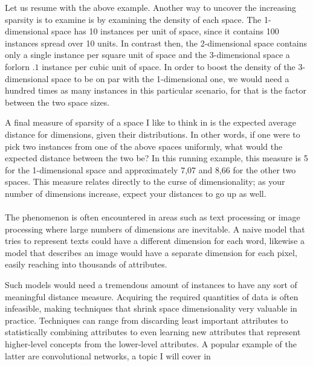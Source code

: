 Let us resume with the above example.
Another way to uncover the increasing sparsity is to examine
is by examining the density of each space.
The 1-dimensional space has 10 instances per unit of space,
since it contains 100 instances spread over 10 units.
In contrast then, the 2-dimensional space contains
only a single instance per square unit of space
and the 3-dimensional space a forlorn $.1$ instance
per cubic unit of space.
In order to boost the density of the 3-dimensional space
to be on par with the 1-dimensional one,
we would need a hundred times as many instances
in this particular scenario,
for that is the factor between the two space sizes.

A final measure of sparsity of a space I like to think in
is the expected average distance for dimensions,
given their distributions.
In other words,
if one were to pick two instances from one of the above spaces uniformly,
what would the expected distance between the two be?
In this running example, %
this measure is 5 for the 1-dimensional space
and approximately 7,07 and 8,66 for the other
two spaces.
This measure relates directly to the curse of dimensionality;
as your number of dimensions increase,
expect your distances to go up as well.

\paragraph{}
The phenomenon is often encountered in areas such as
text processing or image processing
where large numbers of dimensions are inevitable.
A naive model that tries to represent texts
could have a different dimension for each word,
likewise a model that describes an image
would have a separate dimension for each pixel,
easily reaching into thousands of attributes.

Such models would need a tremendous amount
of instances to have any sort of meaningful
distance measure.
Acquiring the required quantities of data
is often infeasible,
making techniques that shrink space dimensionality
very valuable in practice.
Techniques can range from discarding
least important attributes to
statistically combining attributes
to even learning new attributes that represent
higher-level concepts
from the lower-level attributes.
A popular example of the latter are
convolutional networks,
a topic I will cover in %

